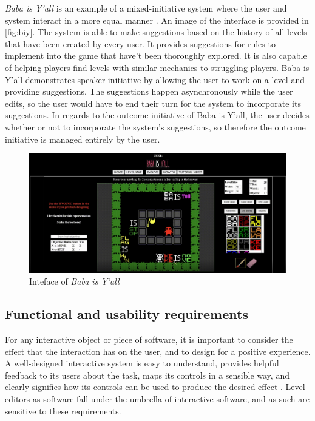 \emph{Baba is Y'all} is an example of a mixed-initiative system where the user and system
interact in a more equal manner \cite{charity2020}. An image of the interface is provided in
\autoref{fig:biy}. The system is able to make suggestions based on the history of all levels
that have been created by every user. It provides suggestions for rules to implement into
the game that have't been thoroughly explored. It is also capable of helping players find
levels with similar mechanics to struggling players. Baba is Y'all demonstrates speaker
initiative by allowing the user to work on a level and providing suggestions. The
suggestions happen asynchronously while the user edits, so the user would have to end their
turn for the system to incorporate its suggestions. In regards to the outcome initiative of
Baba is Y'all, the user decides whether or not to incorporate the system's suggestions, so
therefore the outcome initiative is managed entirely by the user.

\begin{figure}[ht]
    \centering
    \includegraphics[width=\linewidth]{img/fig9-biy.png}
    \caption{Inteface of \emph{Baba is Y'all}}
    \label{fig:biy}
\end{figure}

\subsection{Functional and usability requirements}

For any interactive object or piece of software, it is important to consider the effect that
the interaction has on the user, and to design for a positive experience. A well-designed
interactive system is easy to understand, provides helpful feedback to its users about the
task, maps its controls in a sensible way, and clearly signifies how its controls can be used
to produce the desired effect \cite{norman2013}. Level editors as software fall under the
umbrella of interactive software, and as such are sensitive to these requirements.

